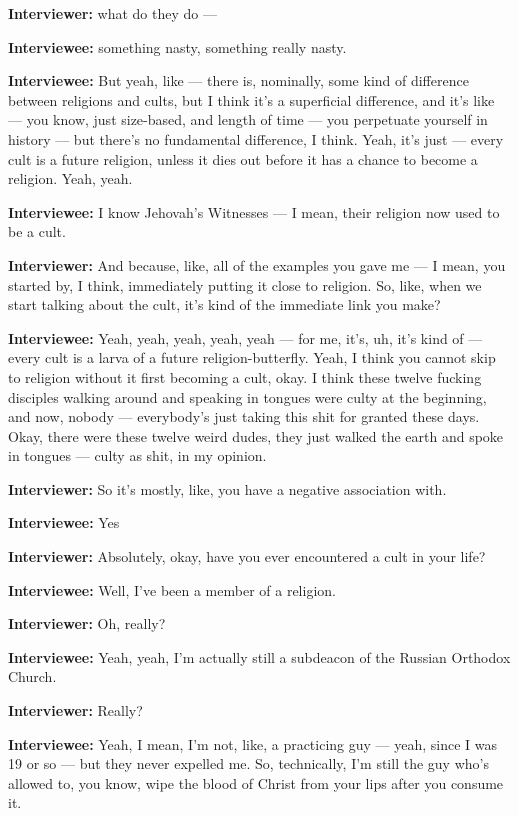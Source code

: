 \textbf{Interviewer:} what do they do —

\textbf{Interviewee:} something nasty, something really nasty.

\textbf{Interviewee:} But yeah, like — there is, nominally, some kind of difference between religions and cults, but I think it's a superficial difference, and it's like — you know, just size-based, and length of time — you perpetuate yourself in history — but there's no fundamental difference, I think. Yeah, it's just — every cult is a future religion, unless it dies out before it has a chance to become a religion. Yeah, yeah.

\textbf{Interviewee:} I know Jehovah's Witnesses — I mean, their religion now used to be a cult.

\textbf{Interviewer:} And because, like, all of the examples you gave me — I mean, you started by, I think, immediately putting it close to religion. So, like, when we start talking about the cult, it's kind of the immediate link you make?

\textbf{Interviewee:} Yeah, yeah, yeah, yeah, yeah — for me, it's, uh, it's kind of — every cult is a larva of a future religion-butterfly. Yeah, I think you cannot skip to religion without it first becoming a cult, okay. I think these twelve fucking disciples walking around and speaking in tongues were culty at the beginning, and now, nobody — everybody's just taking this shit for granted these days. Okay, there were these twelve weird dudes, they just walked the earth and spoke in tongues — culty as shit, in my opinion.

\textbf{Interviewer:} So it's mostly, like, you have a negative association with.

\textbf{Interviewee:} Yes

\textbf{Interviewer:} Absolutely, okay, have you ever encountered a cult in your life?

\textbf{Interviewee:} Well, I've been a member of a religion.

\textbf{Interviewer:} Oh, really?

\textbf{Interviewee:} Yeah, yeah, I'm actually still a subdeacon of the Russian Orthodox Church.

\textbf{Interviewer:} Really?

\textbf{Interviewee:} Yeah, I mean, I'm not, like, a practicing guy — yeah, since I was 19 or so — but they never expelled me. So, technically, I'm still the guy who's allowed to, you know, wipe the blood of Christ from your lips after you consume it.


